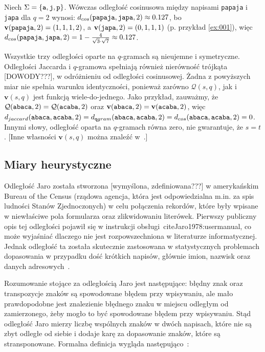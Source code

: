 \documentclass{praca1}
\begin{document}
\begin{example}
Niech $\Sigma = \{\verb|a|, \verb|j|, \verb|p|\}$. Wówczas odległość cosinusowa między napisami \verb|papaja| i \verb|japa| dla $q = 2$ wynosi: $d_{cos}(\verb|papaja|, \verb|japa|, 2) \approx 0.127$, bo $\mathbf{v}( \verb|papaja|,2) = (1, 1, 1, 2)$, a  $\mathbf{v}( \verb|japa|,2) = (0, 1, 1, 1)$ (p. przykład \ref{ex:001}), więc $d_{cos}(\verb|papaja|, \verb|japa|, 2) = 1 - \frac{4}{\sqrt{3}\cdot\sqrt{7}} \approx 0.127$.
\end{example}

Wszystkie trzy odległości oparte na $q$-gramach są nieujemne i symetryczne. Odległości Jaccarda i $q$-gramowa spełniają również nierówność trójkąta [DOWODY???], w odróżnieniu od odległości cosinusowej. Żadna z powyższych miar nie spełnia warunku identyczności, ponieważ zarówno $\mathcal{Q}(s,q)$, jak i $\mathbf{v}(s,q)$ jest funkcją wiele-do-jednego. Jako przykład, zauważmy, że $\mathcal{Q}(\verb|abaca|,2) = \mathcal{Q}(\verb|acaba|,2)$ oraz $\mathbf{v}(\verb|abaca|,2) = \mathbf{v}(\verb|acaba|,2)$, więc $d_{jaccard}(\verb|abaca|, \verb|acaba|, 2) = d_{\mathtt{q}gram}(\verb|abaca|, \verb|acaba|, 2) = d_{cos}(\verb|abaca|, \verb|acaba|, 2) = 0$. Innymi słowy, odległość oparta na $q$-gramach równa zero, nie gwarantuje, że $s = t$. [Inne własności $\mathbf{v}(s,q)$ można znaleźć w~\cite{Ukkonen1992:approxqgrams}.]


\subsection{Miary heurystyczne}


Odległość Jaro została stworzona [wymyślona, zdefiniowana???] w amerykańskim Bureau of the Census (rządowa agencja, która jest odpowiedzialna m.in. za spis ludności Stanów Zjednoczonych) w celu połączenia rekordów, które były wpisane w niewłaściwe pola formularza oraz zlikwidowaniu literówek. Pierwszy publiczny opis tej odległości pojawił się w instrukcji obsługi~cite{Jaro1978:usermanual}, co może wyjaśniać dlaczego nie jest rozpowszechniona w literaturze informatycznej. Jednak odległość ta została skutecznie zastosowana w statystycznych problemach dopasowania w przypadku dość krótkich napisów, głównie imion, nazwisk oraz danych adresowych~\cite{Loo2014:stringdist}.

Rozumowanie stojące za odległością Jaro jest następujące: błędny znak oraz transpozycje znaków są spowodowane błędem przy wpisywaniu, ale mało prawdopodobne jest znalezienie błędnego znaku w miejscu odległym od zamierzonego, żeby mogło to być spowodowane błędem przy wpisywaniu. Stąd odległość Jaro mierzy liczbę wspólnych znaków w dwóch napisach, które nie są zbyt odległe od siebie i dodaje karę za dopasowanie znaków, które są stransponowane. Formalna definicja wygląda następująco~\cite{Loo2014:stringdist}:
\end{document}
